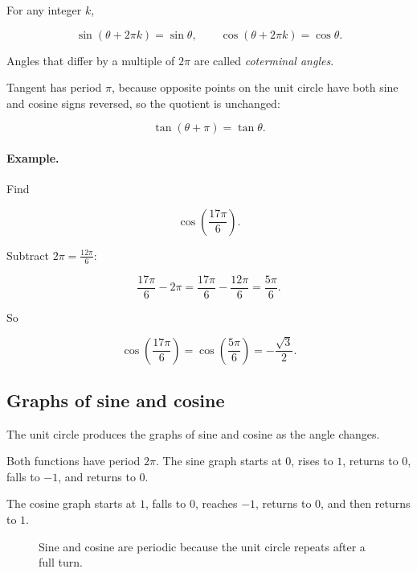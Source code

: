 For any integer \(k\),

\[
\boxed{
\sin(\theta+2\pi k)=\sin\theta,
\qquad
\cos(\theta+2\pi k)=\cos\theta.
}
\]

Angles that differ by a multiple of \(2\pi\) are called \emph{coterminal angles}.

Tangent has period \(\pi\), because opposite points on the unit circle have both sine
and cosine signs reversed, so the quotient is unchanged:

\[
\boxed{
\tan(\theta+\pi)=\tan\theta.
}
\]

\paragraph{Example.}
Find

\[
\cos\left(\frac{17\pi}{6}\right).
\]

Subtract \(2\pi=\frac{12\pi}{6}\):

\[
\frac{17\pi}{6}-2\pi
=
\frac{17\pi}{6}-\frac{12\pi}{6}
=
\frac{5\pi}{6}.
\]

So

\[
\cos\left(\frac{17\pi}{6}\right)
=
\cos\left(\frac{5\pi}{6}\right)
=
-\frac{\sqrt3}{2}.
\]

\subsection{Graphs of sine and cosine}
\label{appsubsec:graphs-sine-cosine-review}

The unit circle produces the graphs of sine and cosine as the angle changes.

Both functions have period \(2\pi\).  The sine graph starts at \(0\), rises to \(1\), returns
to \(0\), falls to \(-1\), and returns to \(0\).

The cosine graph starts at \(1\), falls to \(0\), reaches \(-1\), returns to \(0\), and
then returns to \(1\).

\begin{figure}[h]
\centering
{}
\caption{Sine and cosine are periodic because the unit circle repeats after a full turn.}
\label{fig:appendix-sine-cosine-graphs}
\end{figure}

